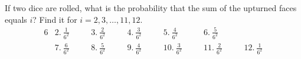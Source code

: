 \item If two dice are rolled, what is the probability that the sum of the upturned faces equals $i$? Find it for $i = 2,3,\dots,11,12$.
\begin{alignat*}{6}
    &2.\ \frac{1}{6^2}\quad &&3.\ \frac{2}{6^2}\quad &&4.\ \frac{3}{6^2}\quad &&5.\ \frac{4}{6^2}\quad &&6.\ \frac{5}{6^2}\\
    &7.\ \frac{6}{6^2}\quad &&8.\ \frac{5}{6^2}\quad &&9.\ \frac{4}{6^2}\quad &&10.\ \frac{3}{6^2}\quad &&11.\ \frac{2}{6^2}\quad &&12.\ \frac{1}{6^2}
\end{alignat*}